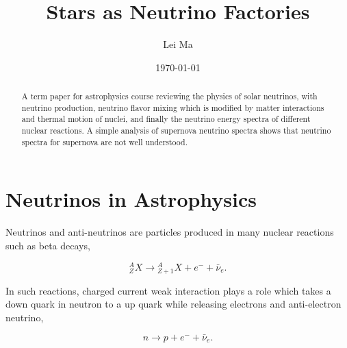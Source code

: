 \documentclass[%
 aip,
 jmp,%
 amsmath,amssymb,
 reprint,%
]{revtex4-1}
\begin{document}
\preprint{}

\title[Stars as Neutrino Factories]{Stars as Neutrino Factories}%

\author{Lei Ma}
%


\date{\today}%
\begin{abstract}
A term paper for astrophysics course reviewing the physics of solar neutrinos, with neutrino production, neutrino flavor mixing which is modified by matter interactions and thermal motion of nuclei, and finally the neutrino energy spectra of different nuclear reactions. A simple analysis of supernova neutrino spectra shows that neutrino spectra for supernova are not well understood.
\end{abstract}


\maketitle


\section{\label{sec:neutrinos_in_astrophysics}Neutrinos in Astrophysics}


Neutrinos and anti-neutrinos are particles produced in many nuclear reactions such as beta decays,

\begin{equation}
{}^A_Z X \to {}_{Z+1}^AX + e^- +\bar \nu_e .
\end{equation}

In such reactions, charged current weak interaction plays a role which takes a down quark in neutron to a up quark while releasing electrons and anti-electron neutrino,

\begin{equation}
n\to p + e^- + \bar \nu_e .
\end{equation}
\end{document}
